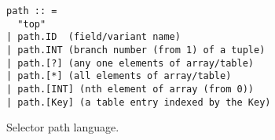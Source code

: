 
    
\begin{figure}
{\small
\begin{verbatim}
path :: =  
  "top"
| path.ID  (field/variant name)
| path.INT (branch number (from 1) of a tuple)
| path.[?] (any one elements of array/table) 
| path.[*] (all elements of array/table) 
| path.[INT] (nth element of array (from 0))
| path.[Key] (a table entry indexed by the Key)
\end{verbatim}
}
\caption{Selector path language.}
\label{fig:selector-lang}
\end{figure}

